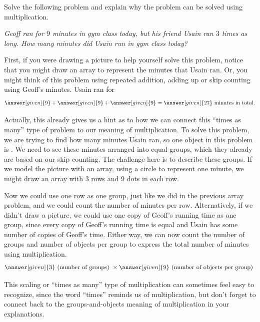 \documentclass{ximera}
\begin{document}
\begin{example}
Solve the following problem and explain why the problem can be solved using multiplication.

\emph{Geoff ran for $9$ minutes in gym class today, but his friend Usain ran $3$ times as long. How many minutes did Usain run in gym class today?}

First, if you were drawing a picture to help yourself solve this problem, notice that you might draw an array to represent the minutes that Usain ran. Or, you might think of this problem using repeated addition, adding up or skip counting using Geoff's minutes. Usain ran for 
\[
\answer[given]{9} + \answer[given]{9} + \answer[given]{9} = \answer[given]{27} \textrm{ minutes in total.}
\]

Actually, this already gives us a hint as to how we can connect this ``times as many'' type of problem to our meaning of multiplication. To solve this problem, we are trying to find how many minutes Usain ran, so one object in this problem is . We need to see these minutes arranged into equal groups, which they already are based on our skip counting. The challenge here is to describe these groups. If we model the picture with an array, using a circle to represent one minute, we might draw an array with $3$ rows and $9$ dots in each row.
\begin{image}
\end{image}
Now we could use one row as one group, just like we did in the previous array problem, and we could count the number of minutes per row. Alternatively, if we didn't draw a picture, we could use one copy of Geoff's running time as one group, since every copy of Geoff's running time is equal and Usain has some number of copies of Geoff's time. Either way, we can now count the number of groups and number of objects per group to express the total number of minutes using multiplication.
\[
\answer[given]{3} \textrm{ (number of groups) } \times \answer[given]{9} \textrm{ (number of objects per group) }
\]
\end{example}

This scaling or ``times as many'' type of multiplication can sometimes feel easy to recognize, since the word ``times'' reminds us of multiplication, but don't forget to connect back to the groups-and-objects meaning of multiplication in your explanations.
\end{document}
